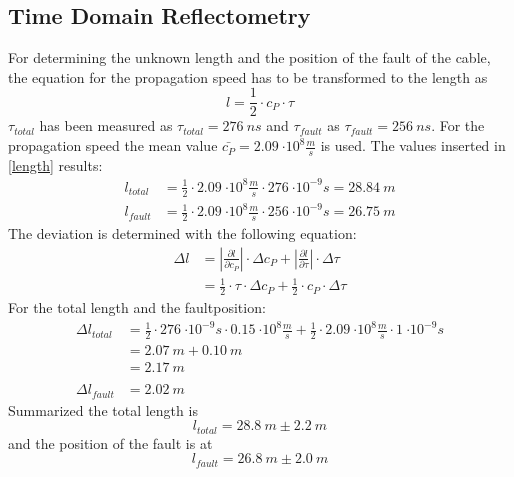 \subsection{Time Domain Reflectometry}
For determining the unknown length and the position of the fault of the cable, the equation for the propagation speed has to be transformed to the length as
\begin{equation}
l=\frac{1}{2}\cdot c_P \cdot \tau
\label{length}
\end{equation}
$\tau_{total}$ has been measured as $ \tau_{total}=\SI{276}{ns} $ and $\tau_{fault}$ as $ \tau_{fault}=\SI{256}{ns} $.
For the propagation speed the mean value $ \bar{c_P}=\SI{2.09}{\cdot 10^8\frac{m}{s}} $ is used. The values inserted in \vref{length} results:
\begin{align*}
l_{total}&=\frac{1}{2}\cdot\SI{2.09}{\cdot 10^8\frac{m}{s}}\cdot \SI{276}{\cdot 10^{-9} s}=\SI{28.84}{m}\\
l_{fault}&=\frac{1}{2}\cdot\SI{2.09}{\cdot 10^8\frac{m}{s}}\cdot \SI{256}{\cdot 10^{-9} s}=\SI{26.75}{m}
\end{align*}
The deviation is determined with the following equation:
\begin{align}
\Delta l&=\left|\frac{\partial l}{\partial c_P}\right|\cdot \Delta c_P + \left|\frac{\partial l}{\partial \tau}\right|\cdot \Delta \tau\\
&=\frac{1}{2}\cdot \tau \cdot \Delta c_P + \frac{1}{2}\cdot c_P \cdot \Delta \tau
\end{align}
For the total length and the faultposition:
\begin{align*}
\Delta l_{total}&=\frac{1}{2} \cdot\SI{276}{\cdot 10^{-9}s}\cdot \SI{0.15}{\cdot 10^8\frac{m}{s}}  + \frac{1}{2}\cdot \SI{2.09}{\cdot 10^8\frac{m}{s}} \cdot\SI{1}{\cdot 10^{-9}s}\\
&=\SI{2.07}{m}+\SI{0.10}{m}\\
&=\SI{2.17}{m}\\
\\
\Delta l_{fault}&=\SI{2.02}{m}
\end{align*}
Summarized the total length is
\begin{equation}
l_{total}=\SI{28.8}{m} \pm \SI{2.2}{m}
\end{equation}
and the position of the fault is at
\begin{equation}
l_{fault}=\SI{26.8}{m} \pm \SI{2.0}{m}
\end{equation}